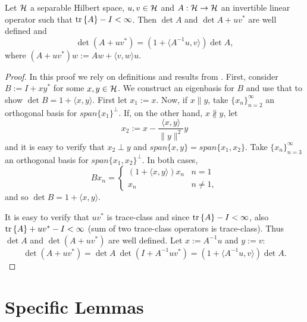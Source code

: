 \documentclass{amsart}
\numberwithin{equation}{section}
\begin{document}
\begin{lemma}\label{lemma:MDL}
  Let $\mathcal{H}$ a separable Hilbert space, $u,v\in \mathcal{H}$ and $A: \mathcal{H} \to
  \mathcal{H}$ an invertible linear operator such that $\textup{tr}\left \{A \right \}-I <
  \infty$. Then $\det A$ and $\det A + uv^*$ are well defined and
  \begin{equation*}
    \det (A + uv^*) = (1 + \langle A^{-1} u, v \rangle ) \det A,
  \end{equation*}
  where $(A + uv^*)w := Aw + \langle v,w \rangle u$.
\end{lemma}
\begin{proof}
  In this proof we rely on definitions and results from
  \cite{Simon77}. First, consider $B := I + xy^*$ for some $x,y \in
  \mathcal{H}$. We construct an eigenbasis for $B$ and use that to show $\det
  B = 1 + \langle x, y \rangle$. First let $x_1 := x$.  Now, if $x
  \parallel y$, take $\{x_n \}_{n=2}^{\infty}$ an orthogonal basis for
  $span\{x_1\} ^{\perp}$. If, on the other hand, $x \nparallel y$, let
  \begin{equation*}
    x_2 := x - \frac{ \langle x, y\rangle}{\|y\|^2}y
  \end{equation*}
  and it is easy to verify that $x_2 \perp y$ and $span \{x,y\} = span
  \{x_1,x_2\}$. Take $\{x_n \}_{n=3}^{\infty}$ an orthogonal basis for
  $span\{x_1,x_2\} ^{\perp}$. In both cases,
  \begin{equation*}
    B x_n =
    \begin{cases}
      (1 + \langle x, y \rangle) x_n & n = 1 \\
      x_n                            & n \neq 1,
    \end{cases}
  \end{equation*}
  and so $\det B = 1 + \langle x, y \rangle$.
  
  It is easy to verify that $uv^*$ is trace-class and since $\textup{tr}\left \{A \right \} - I
  < \infty$, also $\textup{tr}\left \{A \right \} + uv^* - I < \infty$ (sum of two trace-class
  operators is trace-class). Thus $\det A$ and $\det (A+uv^*)$ are
  well defined. Let $x:=A^{-1}u$ and $y := v$:
  \begin{equation*}
    \det (A + uv^*) = \det A \ \det(I+A^{-1}uv^*) =
    (1 + \langle A^{-1}u, v \rangle) \det A .
  \end{equation*}
\end{proof}





\section{Specific Lemmas}
\end{document}

